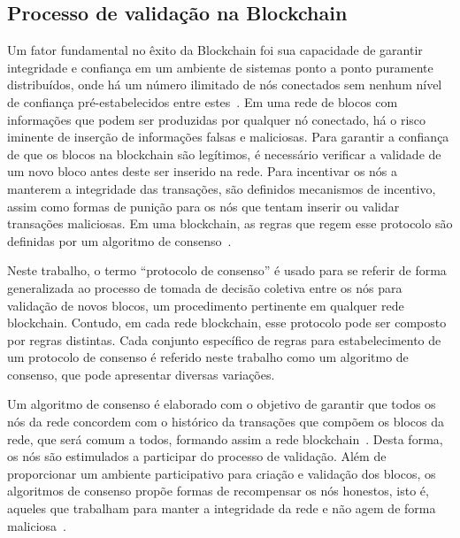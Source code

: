 \subsection{Processo de validação na Blockchain} \label{tex:fund:blockchain:consenso}

Um fator fundamental no êxito da Blockchain foi sua capacidade de garantir integridade e confiança em um ambiente de sistemas ponto a ponto puramente distribuídos, onde há um número ilimitado de nós conectados sem nenhum nível de confiança pré-estabelecidos entre estes~\cite{overview-blockchainbasic2018drescher}. Em uma rede de blocos com informações que podem ser produzidas por qualquer nó conectado, há o risco iminente de inserção de informações falsas e maliciosas. Para garantir a confiança de que os blocos na blockchain são legítimos, é necessário verificar a validade de um novo bloco antes deste ser inserido na rede. Para incentivar os nós a manterem a integridade das transações, são definidos mecanismos de incentivo, assim como formas de punição para os nós que tentam inserir ou validar transações maliciosas. Em uma blockchain, as regras que regem esse protocolo são definidas por um algoritmo de consenso~\cite{overview-consenso2017sankar, consenso-zhang2020analysis, consenso-Bouraga2021}.


Neste trabalho, o termo ``protocolo de consenso'' é usado para se referir de forma generalizada ao processo de tomada de decisão coletiva entre os nós para validação de novos blocos, um procedimento pertinente em qualquer rede blockchain. Contudo, em cada rede blockchain, esse protocolo pode ser composto por regras distintas. Cada conjunto específico de regras para estabelecimento de um protocolo de consenso é referido neste trabalho como um algoritmo de consenso, que pode apresentar diversas variações.

Um algoritmo de consenso é elaborado com o objetivo de garantir que todos os nós da rede concordem com o histórico da transações que compõem os blocos da rede, que será comum a todos, formando assim a rede blockchain~\cite{consenso-xiao-2020}. Desta forma, os nós são estimulados a participar do processo de validação. Além de proporcionar um ambiente participativo para criação e validação dos blocos, os algoritmos de consenso propõe formas de recompensar os nós honestos, isto é, aqueles que trabalham para manter a integridade da rede e não agem de forma maliciosa~\cite{overview-consenso2017sankar}. 

